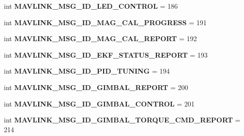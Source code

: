 \begin{DoxyCompactItemize}
\item 
\mbox{\label{namespacepymavlink_1_1dialects_1_1v10_af5ae29a4a2b72ed14e6d0412834c0723}} 
int {\bfseries M\+A\+V\+L\+I\+N\+K\+\_\+\+M\+S\+G\+\_\+\+I\+D\+\_\+\+L\+E\+D\+\_\+\+C\+O\+N\+T\+R\+OL} = 186
\item 
\mbox{\label{namespacepymavlink_1_1dialects_1_1v10_a052399c72506de631a2b7e90814abc13}} 
int {\bfseries M\+A\+V\+L\+I\+N\+K\+\_\+\+M\+S\+G\+\_\+\+I\+D\+\_\+\+M\+A\+G\+\_\+\+C\+A\+L\+\_\+\+P\+R\+O\+G\+R\+E\+SS} = 191
\item 
\mbox{\label{namespacepymavlink_1_1dialects_1_1v10_a78132350a94a6e7670a6c24c5da99371}} 
int {\bfseries M\+A\+V\+L\+I\+N\+K\+\_\+\+M\+S\+G\+\_\+\+I\+D\+\_\+\+M\+A\+G\+\_\+\+C\+A\+L\+\_\+\+R\+E\+P\+O\+RT} = 192
\item 
\mbox{\label{namespacepymavlink_1_1dialects_1_1v10_a9bd589c5402ee9ce33743806842f1d63}} 
int {\bfseries M\+A\+V\+L\+I\+N\+K\+\_\+\+M\+S\+G\+\_\+\+I\+D\+\_\+\+E\+K\+F\+\_\+\+S\+T\+A\+T\+U\+S\+\_\+\+R\+E\+P\+O\+RT} = 193
\item 
\mbox{\label{namespacepymavlink_1_1dialects_1_1v10_a4e9ad22cdfb71553b3300dd9b0347fed}} 
int {\bfseries M\+A\+V\+L\+I\+N\+K\+\_\+\+M\+S\+G\+\_\+\+I\+D\+\_\+\+P\+I\+D\+\_\+\+T\+U\+N\+I\+NG} = 194
\item 
\mbox{\label{namespacepymavlink_1_1dialects_1_1v10_a7d39369b7455ebe15af3e9d346078845}} 
int {\bfseries M\+A\+V\+L\+I\+N\+K\+\_\+\+M\+S\+G\+\_\+\+I\+D\+\_\+\+G\+I\+M\+B\+A\+L\+\_\+\+R\+E\+P\+O\+RT} = 200
\item 
\mbox{\label{namespacepymavlink_1_1dialects_1_1v10_ae6f8475e10ed1b4acc4c4baeb267623b}} 
int {\bfseries M\+A\+V\+L\+I\+N\+K\+\_\+\+M\+S\+G\+\_\+\+I\+D\+\_\+\+G\+I\+M\+B\+A\+L\+\_\+\+C\+O\+N\+T\+R\+OL} = 201
\item 
\mbox{\label{namespacepymavlink_1_1dialects_1_1v10_a8360f46189796c1f94086d51a92dba80}} 
int {\bfseries M\+A\+V\+L\+I\+N\+K\+\_\+\+M\+S\+G\+\_\+\+I\+D\+\_\+\+G\+I\+M\+B\+A\+L\+\_\+\+T\+O\+R\+Q\+U\+E\+\_\+\+C\+M\+D\+\_\+\+R\+E\+P\+O\+RT} = 214

\end{DoxyCompactItemize}
